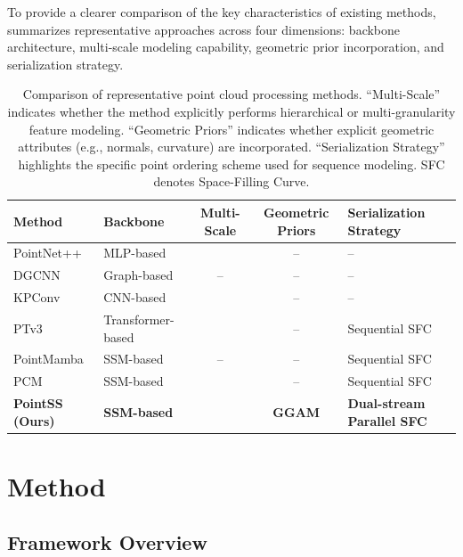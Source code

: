 \documentclass[a4paper,fleqn]{cas-sc}
\begin{document}
To provide a clearer comparison of the key characteristics of existing methods,  summarizes representative approaches across four dimensions: backbone architecture, multi-scale modeling capability, geometric prior incorporation, and serialization strategy.

\begin{table}[htbp]
	\centering
	\caption{Comparison of representative point cloud processing methods. ``Multi-Scale'' indicates whether the method explicitly performs hierarchical or multi-granularity feature modeling. ``Geometric Priors'' indicates whether explicit geometric attributes (e.g., normals, curvature) are incorporated. ``Serialization Strategy'' highlights the specific point ordering scheme used for sequence modeling. SFC denotes Space-Filling Curve.}
	\label{tab:related_comp}
	\begin{tabular}{llccl}
		\hline
		\textbf{Method} & \textbf{Backbone} & \textbf{Multi-Scale} & \textbf{Geometric Priors} & \textbf{Serialization Strategy} \\
		\hline
		PointNet++ \cite{PointNet++} & MLP-based       & \checkmark & --   & --                        \\
		DGCNN \cite{DGCNN}           & Graph-based     & --         & --   & --                        \\
		KPConv \cite{KPConv}         & CNN-based       & \checkmark & --   & --                        \\
		PTv3 \cite{ptv3}             & Transformer-based & \checkmark & --  & Sequential SFC            \\
		PointMamba \cite{PointMamba} & SSM-based       & --         & --   & Sequential SFC            \\
		PCM \cite{pcm}               & SSM-based       & \checkmark & --   & Sequential SFC            \\
		\textbf{PointSS (Ours)}      & \textbf{SSM-based} & \textbf{\checkmark} & \textbf{GGAM} & \textbf{Dual-stream Parallel SFC} \\
		\hline
	\end{tabular}
\end{table}

\section{Method}\label{sec:method}

\subsection{Framework Overview}
\end{document}
